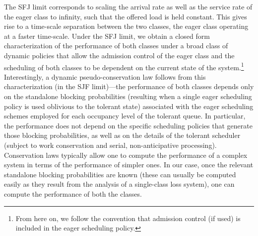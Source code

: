  

The SFJ limit corresponds to scaling the arrival rate as well as the
service rate of the eager class to infinity, such that the offered
load is held constant. This gives rise to a time-scale separation
between the two classes, the eager class operating at a faster
time-scale. Under the SFJ limit, we obtain a closed form
characterization of the performance of both classes under a broad
class of dynamic policies that allow the admission control of the
eager class and the scheduling of both classes to be dependent on the
current state of the system.\footnote{From here on, we follow the
  convention that admission control (if used) is included in the eager
  scheduling policy.\label{footnote:eps-scheduling}} Interestingly, a
dynamic pseudo-conservation law follows from this characterization (in
the SJF limit)---the performance of both classes depends only on the
standalone blocking probabilities (resulting when a single eager
scheduling policy is used oblivious to the tolerant state) associated
with the eager scheduling schemes employed for each occupancy level of
the tolerant queue. In particular, the performance does not depend on
the specific scheduling policies that generate those blocking
probabilities, as well as on the details of the tolerant scheduler
(subject to work conservation and serial, non-anticipative
processing). Conservation laws typically allow one to compute the
performance of a complex system in terms of the performance of simpler
ones. In our case, once the relevant standalone blocking probabilities
are known (these can usually be computed easily as they result from
the analysis of a single-class loss system), one can compute the
performance of both the classes.

